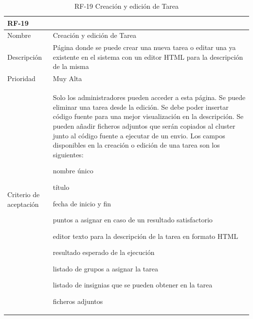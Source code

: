 \documentclass[11pt,spanish,listoffigures,listoftables]{tfgetsinf}
\begin{document}
\begin{table}[ht!]
	\centering
	\begin{tabular}{ |p{4cm}||p{10cm}|  }
		\multicolumn{2}{l}{\textbf{RF-19}} \\
		\hline
		Nombre & Creación y edición de Tarea \\
		\hline
		Descripción & Página donde se puede crear una nueva \gls{tarea} o editar una ya existente en el sistema con un editor HTML para la descripción de la misma \\
		\hline
		Prioridad & Muy Alta\\
		\hline
		Criterio de aceptación & Solo los \gls{administrador}es pueden acceder a esta página. \newline
		Se puede eliminar una \gls{tarea} desde la edición. \newline
		Se debe poder insertar código fuente para una mejor visualización en la descripción. \newline
		Se pueden añadir ficheros adjuntos que serán copiados al cluster \kahan junto al código fuente a ejecutar de un \gls{envio}. \newline
		Los campos disponibles en la creación o edición de una \gls{tarea} son los siguientes: \newline
		\begin{tabitem}
			\item nombre único
			\item título
			\item fecha de inicio y fin
			\item puntos a asignar en caso de un resultado satisfactorio
			\item editor texto para la descripción de la \gls{tarea} en formato HTML
			\item resultado esperado de la ejecución
			\item listado de \gls{grupo}s a asignar la tarea
			\item listado de \gls{insignia}s que se pueden obtener en la \gls{tarea}
			\item ficheros adjuntos
		\end{tabitem} \\
		\hline
	\end{tabular}
	\caption{RF-19 Creación y edición de Tarea}
	\label{table:19}
\end{table}
\end{document}
